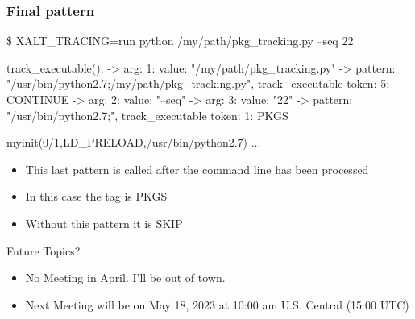 \documentclass{beamer}
\begin{document}
\begin{frame}[fragile]
    \frametitle{Final pattern}
 {\tiny
    \begin{semiverbatim}
\$ XALT\_TRACING=run python /my/path/pkg\_tracking.py --seq 22

   track_executable():
    -> arg: 1: value: "/my/path/pkg\_tracking.py"
    -> pattern: "/usr/bin/python2.7;/my/path/pkg\_tracking.py",
       track_executable token: 5: CONTINUE
    -> arg: 2: value: "--seq"
    -> arg: 3: value: "22"
    -> pattern: "/usr/bin/python2.7;", track_executable token: 1: PKGS

myinit(0/1,LD_PRELOAD,/usr/bin/python2.7){
  ...
}
    \end{semiverbatim}
}
  \begin{itemize}
    \item This last pattern is called after the command line has been
      processed
    \item In this case the tag is PKGS
    \item Without this pattern it is SKIP
  \end{itemize}

\end{frame}



\begin{frame}{Future Topics?}
  \begin{itemize}
    \item No Meeting in April.  I'll be out of town.
    \item Next Meeting will be on May 18, 2023 at 10:00 am
      U.S. Central (15:00 UTC)
  \end{itemize}
\end{frame}

%
\end{document}
